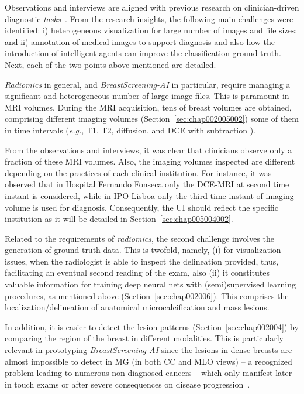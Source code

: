 Observations and interviews are aligned with previous research on clinician-driven diagnostic {\it tasks}~\cite{rosset2004osirix, wolf2005medical, Sultanum:2018:MTP:3173574.3173996, weese2016four, heinrich2012mind}.
From the research insights, the following main challenges were identified:
i) heterogeneous visualization for large number of images and file sizes; and
ii) annotation of medical images to support diagnosis and also how the introduction of intelligent agents can improve the classification ground-truth.
Next, each of the two points above mentioned are detailed.

{\it Radiomics} in general, and {\it BreastScreening-AI} in particular, require managing a significant and heterogeneous number of large image files.
This is paramount in \ac{MRI} volumes.
During the \ac{MRI} acquisition, tens of breast volumes are obtained, comprising different imaging volumes (Section~\ref{sec:chap002005002}) some of them in time intervals ({\it e.g.}, T1, T2, diffusion, and \ac{DCE} with subtraction \cite{sorace2018distinguishing}).

From the  observations and interviews, it was clear that clinicians observe only a fraction of these \ac{MRI} volumes.
Also, the imaging volumes inspected are different depending on the practices of each clinical institution.
For instance, it was observed that in Hospital Fernando Fonseca only the \ac{DCE}-\ac{MRI} at second time instant is considered, while in IPO Lisboa only the third time instant of imaging volume is used for diagnosis.
Consequently, the \ac{UI} should reflect the specific institution as it will be detailed in Section~\ref{sec:chap005004002}.

Related to the requirements of {\it radiomics}, the second challenge involves the generation of ground-truth data. This is twofold, namely, (i) for visualization issues, when the radiologist is able to inspect the delineation provided, thus, facilitating an eventual second reading of the exam, also (ii) it constitutes valuable information for training deep neural nets with (semi)supervised learning procedures, as mentioned above (Section~\ref{sec:chap002006}).
This comprises the localization/delineation of anatomical microcalcification and mass lesions.

In addition, it is easier to detect the lesion patterns (Section~\ref{sec:chap002004}) by comparing the region of the breast in different modalities.
This is particularly relevant in prototyping {\it BreastScreening-AI} since the lesions in dense breasts are almost impossible to detect in \ac{MG} (in both \ac{CC} and \ac{MLO} views) -- a recognized problem leading to numerous non-diagnosed cancers -- which only manifest later in touch exams or after severe consequences on disease progression~\cite{mohamed2018deep}.

